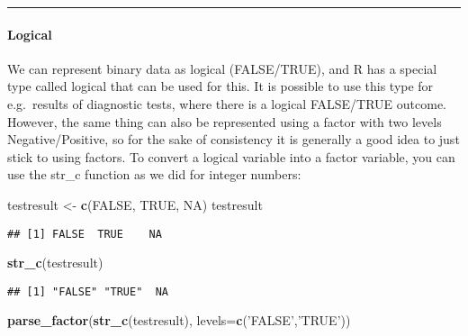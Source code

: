 \documentclass[
]{article}
\newenvironment{Shaded}{\begin{snugshade}}{\end{snugshade}}
\newcommand{\DataTypeTok}[1]{\textcolor[rgb]{0.13,0.29,0.53}{#1}}
\newcommand{\KeywordTok}[1]{\textcolor[rgb]{0.13,0.29,0.53}{\textbf{#1}}}
\newcommand{\NormalTok}[1]{#1}
\newcommand{\OtherTok}[1]{\textcolor[rgb]{0.56,0.35,0.01}{#1}}
\newcommand{\StringTok}[1]{\textcolor[rgb]{0.31,0.60,0.02}{#1}}
\begin{document}
\begin{center}\rule{0.5\linewidth}{0.5pt}\end{center}

\hypertarget{logical}{%
\paragraph{Logical}\label{logical}}

We can represent binary data as logical (FALSE/TRUE), and R has a
special type called logical that can be used for this. It is possible to
use this type for e.g.~results of diagnostic tests, where there is a
logical FALSE/TRUE outcome. However, the same thing can also be
represented using a factor with two levels Negative/Positive, so for the
sake of consistency it is generally a good idea to just stick to using
factors. To convert a logical variable into a factor variable, you can
use the str\_c function as we did for integer numbers:

\begin{Shaded}
\begin{Highlighting}[]
\NormalTok{testresult <-}\StringTok{ }\KeywordTok{c}\NormalTok{(}\OtherTok{FALSE}\NormalTok{, }\OtherTok{TRUE}\NormalTok{, }\OtherTok{NA}\NormalTok{)}
\NormalTok{testresult}
\end{Highlighting}
\end{Shaded}

\begin{verbatim}
## [1] FALSE  TRUE    NA
\end{verbatim}

\begin{Shaded}
\begin{Highlighting}[]
\KeywordTok{str_c}\NormalTok{(testresult)}
\end{Highlighting}
\end{Shaded}

\begin{verbatim}
## [1] "FALSE" "TRUE"  NA
\end{verbatim}

\begin{Shaded}
\begin{Highlighting}[]
\KeywordTok{parse_factor}\NormalTok{(}\KeywordTok{str_c}\NormalTok{(testresult), }\DataTypeTok{levels=}\KeywordTok{c}\NormalTok{(}\StringTok{'FALSE'}\NormalTok{,}\StringTok{'TRUE'}\NormalTok{))}
\end{Highlighting}
\end{Shaded}
\end{document}
